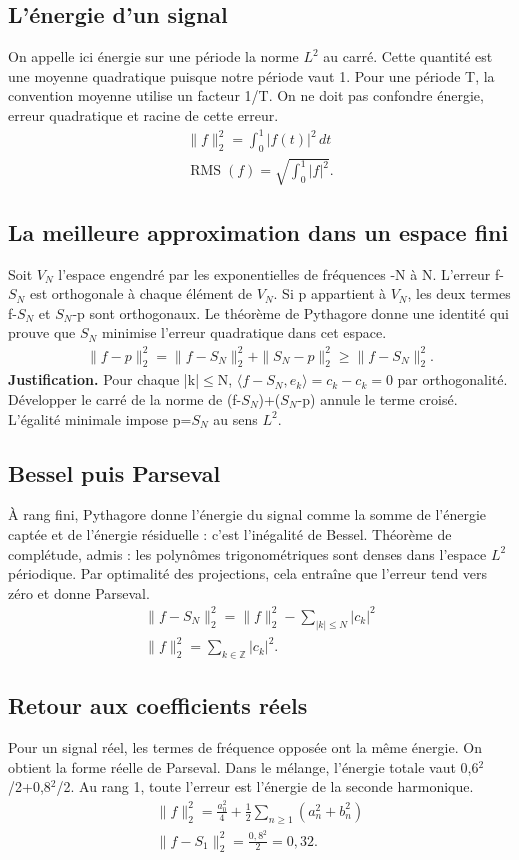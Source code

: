\documentclass[11pt,a4paper]{article}
\begin{document}
\subsection{L’énergie d’un signal}
On appelle ici énergie sur une période la norme $L^2$ au carré. Cette quantité est une moyenne quadratique puisque notre période vaut 1. Pour une période T, la convention moyenne utilise un facteur 1/T. On ne doit pas confondre énergie, erreur quadratique et racine de cette erreur.
\[\begin{gathered}\|f\|_2^2=\int_0^1|f(t)|^2\,dt\\ \operatorname{RMS}(f)=\sqrt{\int_0^1|f|^2}.\end{gathered}\]
\subsection{La meilleure approximation dans un espace fini}
Soit $V_N$ l’espace engendré par les exponentielles de fréquences -N à N. L’erreur f-$S_N$ est orthogonale à chaque élément de $V_N$. Si p appartient à $V_N$, les deux termes f-$S_N$ et $S_N$-p sont orthogonaux. Le théorème de Pythagore donne une identité qui prouve que $S_N$ minimise l’erreur quadratique dans cet espace.
\[\begin{gathered}\|f-p\|_2^2=\|f-S_N\|_2^2+\|S_N-p\|_2^2\ge\|f-S_N\|_2^2.\end{gathered}\]
\textbf{Justification.} Pour chaque |k|$\le$N, $\langle f-S_N,e_k\rangle=c_k-c_k=0$ par orthogonalité. Développer le carré de la norme de (f-$S_N$)+($S_N$-p) annule le terme croisé. L’égalité minimale impose p=$S_N$ au sens $L^2$.
\subsection{Bessel puis Parseval}
À rang fini, Pythagore donne l’énergie du signal comme la somme de l’énergie captée et de l’énergie résiduelle : c’est l’inégalité de Bessel. Théorème de complétude, admis : les polynômes trigonométriques sont denses dans l’espace $L^2$ périodique. Par optimalité des projections, cela entraîne que l’erreur tend vers zéro et donne Parseval.
\[\begin{gathered}\|f-S_N\|_2^2=\|f\|_2^2-\sum_{|k|\le N}|c_k|^2\\\|f\|_2^2=\sum_{k\in\mathbb Z}|c_k|^2.\end{gathered}\]
\subsection{Retour aux coefficients réels}
Pour un signal réel, les termes de fréquence opposée ont la même énergie. On obtient la forme réelle de Parseval. Dans le mélange, l’énergie totale vaut 0,6$^2$/2+0,8$^2$/2. Au rang 1, toute l’erreur est l’énergie de la seconde harmonique.
\[\begin{gathered}\|f\|_2^2=\frac{a_0^2}{4}+\frac12\sum_{n\ge1}(a_n^2+b_n^2)\\ \|f-S_1\|_2^2=\frac{0{,}8^2}{2}=0{,}32.\end{gathered}\]
\end{document}
